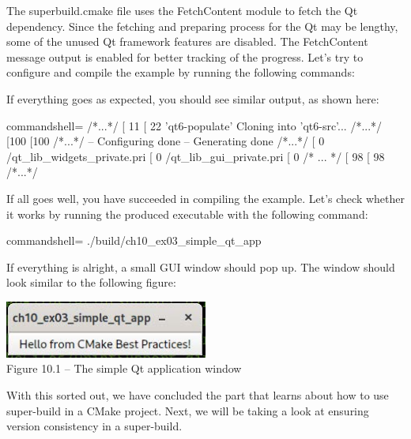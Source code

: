 The superbuild.cmake file uses the FetchContent module to fetch the Qt dependency. Since the fetching and preparing process for the Qt may be lengthy, some of the unused Qt framework features are disabled. The FetchContent message output is enabled for better tracking of the progress. Let's try to configure and compile the example by running the following commands:


If everything goes as expected, you should see similar output, as shown here:

\begin{tcblisting}{commandshell={}}
/*...*/
[ 11%
[ 22%
  'qt6-populate'
Cloning into 'qt6-src'...
/*...*/
[100%
[100%
/*...*/
-- Configuring done
-- Generating done
/*...*/
[ 0%
  /qt_lib_widgets_private.pri
[ 0%
/qt_lib_gui_private.pri
[ 0%
/* ... */
[ 98%
[ 98%
/*...*/
\end{tcblisting}

If all goes well, you have succeeded in compiling the example. Let's check whether it works by running the produced executable with the following command:

\begin{tcblisting}{commandshell={}}
./build/ch10_ex03_simple_qt_app
\end{tcblisting}

If everything is alright, a small GUI window should pop up. The window should look similar to the following figure:

\begin{center}
\includegraphics[width=0.5\textwidth]{content/2/chapter10/images/1.jpg}\\
Figure 10.1 – The simple Qt application window
\end{center}

With this sorted out, we have concluded the part that learns about how to use super-build in a CMake project. Next, we will be taking a look at ensuring version consistency in a super-build.

















